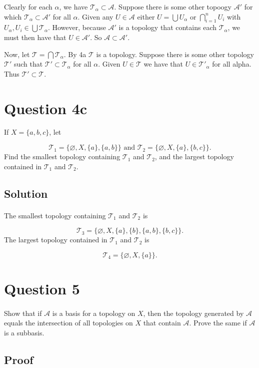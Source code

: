 \documentclass[11pt, oneside]{article}   	%
\begin{document}
Clearly for each $\alpha$, we have $\mathscr{T}_\alpha \subset \mathscr{A}$. Suppose there is some other topoogy $\mathscr{A}'$ for which $\mathscr{T}_\alpha \subset \mathscr{A}'$ for all $\alpha$. Given any $U \in \mathscr{A}$ either $U =  \bigcup U_{\alpha}$ or $\bigcap_{i=1}^n U_i$ with $U_\alpha, U_i \in \bigcup \mathscr{T}_\alpha$. However, because $\mathscr{A}'$ is a topology that contains each $\mathscr{T}_\alpha$, we must then have that $U \in \mathscr{A}'$. So $\mathscr{A} \subset \mathscr{A}'$.

Now, let $\mathscr{T} = \bigcap \mathscr{T}_\alpha$. By 4a $\mathscr{T}$ is a topology. Suppose there is some other topology $\mathscr{T}'$ such that $\mathscr{T}' \subset \mathscr{T}_\alpha$ for all $\alpha$. Given $U \in \mathscr{T}$ we have that $U \in \mathscr{T}'_\alpha$ for all alpha. Thus $\mathscr{T}' \subset \mathscr{T}$.


\section*{Question 4c}
If $X = \{a,b,c\}$, let

\[
\mathscr{T}_1 = \{\varnothing, X, \{a\}, \{a,b\}\} \text{ and } \mathscr{T}_2 = \{ \varnothing, X, \{a\}, \{b,c \}\}.
\]
Find the smallest topology containing $ \mathscr{T}_1$ and $\mathscr{T}_2$, and the largest topology contained in $ \mathscr{T}_1$ and $\mathscr{T}_2$.

\subsection*{Solution}
\paragraph{}

The smallest topology containing $ \mathscr{T}_1$ and $\mathscr{T}_2$ is 

\[
\mathscr{T}_3 = \{\varnothing, X, \{a\}, \{b\}, \{a,b\}, \{b,c\} \}.
\]
The largest topology contained in $ \mathscr{T}_1$ and $\mathscr{T}_2$ is

\[
\mathscr{T}_4 = \{\varnothing, X, \{a\} \}.
\]




\section*{Question 5}
\paragraph{}

Show that if $\mathscr{A}$ is a basis for a topology on $X$, then the topology generated by $\mathscr{A}$ equals the intersection of all topologies on $X$ that contain $\mathscr{A}$. Prove the same if $\mathscr{A}$ is a subbasis.

\subsection*{Proof}
\end{document}
